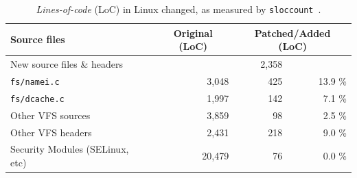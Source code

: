 \begin{table}[t]
\scriptsize
\centering
\begin{tabular}{p{1.4in}rrr}
Source files & \multicolumn{1}{c}{Original (LoC)} & \multicolumn{2}{c}{Patched/Added (LoC)} \\
\hline
New source files \& headers  & & 2,358 & \\
\hline
{\tt fs/namei.c}   & 3,048 & 425 & 13.9 \% \\
\hline
{\tt fs/dcache.c}  & 1,997 & 142 &  7.1 \% \\
\hline
Other VFS sources  & 3,859 &  98 &  2.5 \% \\
\hline
Other VFS headers  & 2,431 & 218 &  9.0 \% \\
\hline
Security Modules (SELinux, etc)   & 20,479 & 76 & 0.0 \% \\
\hline
\end{tabular}
\caption{{\em Lines-of-code} (LoC) in Linux changed, as measured by {\tt sloccount}~\citep{sloccount}.}
\label{table:dcache:portability}
\end{table}


